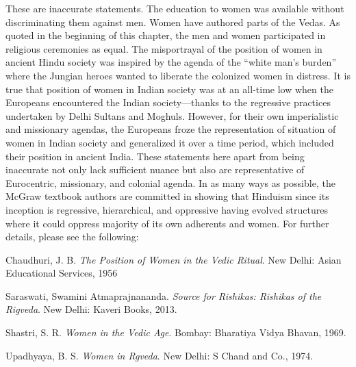 These are inaccurate statements. The education to women was available without discriminating them against men. Women have authored parts of the Vedas. As quoted in the beginning of this chapter, the men and women participated in religious ceremonies as equal. The misportrayal of the position of women in ancient Hindu society was inspired by the agenda of the “white man’s burden” where the Jungian heroes wanted to liberate the colonized women in distress. It is true that position of women in Indian society was at an all-time low when the Europeans encountered the Indian society—thanks to the regressive practices undertaken by Delhi Sultans and Moghuls. However, for their own imperialistic and missionary agendas, the Europeans froze the representation of situation of women in Indian society and generalized it over a time period, which included their position in ancient India. These statements here apart from being inaccurate not only lack sufficient nuance but also are representative of Eurocentric, missionary, and colonial agenda. In as many ways as possible, the McGraw textbook authors are committed in showing that Hinduism since its inception is regressive, hierarchical, and oppressive having evolved structures where it could oppress majority of its own adherents and women. For further details, please see the following:

\begin{thebibliography}{99}
 Chaudhuri, J. B. \textit{The Position of Women in the Vedic Ritual}. New Delhi: Asian Educational Services, 1956

 Saraswati, Swamini Atmaprajnananda. \textit{Source for Rishikas: Rishikas of the Rigveda}. New Delhi: Kaveri Books, 2013.

 Shastri, S. R. \textit{Women in the Vedic Age}. Bombay: Bharatiya Vidya Bhavan, 1969.

 Upadhyaya, B. S. \textit{Women in Rgveda}. New Delhi: S Chand and Co., 1974.
\end{thebibliography}

\begin{longtable}{|>{\raggedleft}p{1.5cm}|p{8.5cm}|}
\multicolumn{2}{|c|{\textbf{Table: 10}} 
\hline
\multicolumn{1}{|l|}{\textbf{Page #}} & \multicolumn{1}{|l|}{\textbf{McGraw Hill Text}} \tabularnewline
\hline
259 & In early India, boys and girls&nbsp;often married in their teens. People could not get divorced. \tabularnewline
\hline
\end{longtable}

